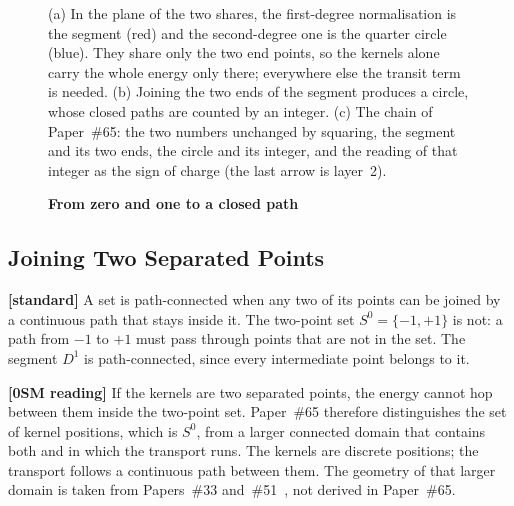 \documentclass[%
 reprint, amsmath,amssymb, aps, prb, ]{revtex4-2}
\numberwithin{equation}{section}
\begin{document}
\begin{figure}[t!]
\caption{\textbf{From zero and one to a closed path}}
\label{fig:g_segment}
\vspace{0.4em}
\begin{minipage}{0.95\textwidth}
\justifying\small
(a) In the plane of the two shares, the first-degree normalisation is the segment (red) and the second-degree one is the quarter circle (blue). They share only the two end points, so the kernels alone carry the whole energy only there; everywhere else the transit term is needed. (b) Joining the two ends of the segment produces a circle, whose closed paths are counted by an integer. (c) The chain of Paper~\#65: the two numbers unchanged by squaring, the segment and its two ends, the circle and its integer, and the reading of that integer as the sign of charge (the last arrow is layer~2).
\end{minipage}
\end{figure}

\subsection{Joining Two Separated Points}
\label{subsec:g_path}

\textbf{[standard]} A set is path-connected when any two of its points can be joined by a continuous path that stays inside it. The two-point set $S^{0} = \{-1,+1\}$ is not: a path from $-1$ to $+1$ must pass through points that are not in the set. The segment $D^{1}$ is path-connected, since every intermediate point belongs to it.

\textbf{[0SM reading]} If the kernels are two separated points, the energy cannot hop between them inside the two-point set. Paper~\#65 therefore distinguishes the set of kernel positions, which is $S^{0}$, from a larger connected domain that contains both and in which the transport runs. The kernels are discrete positions; the transport follows a continuous path between them. The geometry of that larger domain is taken from Papers~\#33 and~\#51~\cite{hanamura51}, not derived in Paper~\#65.
\end{document}
